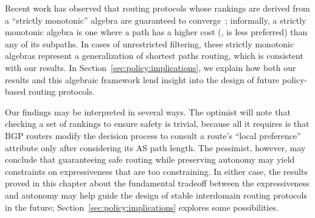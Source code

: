 Recent work has observed that routing protocols whose rankings are
derived from a ``strictly monotonic'' algebra are guaranteed to
converge~\cite{Griffin2005}; informally, a strictly monotonic algebra is
one where a path has a higher cost (\ie, is less preferred) than any
of its
subpaths.  In cases of unrestricted filtering,
these strictly monotonic algebras represent a generalization of shortest
paths routing, which is consistent with our results.  In
Section~\ref{sec:policy:implications}, we explain how both our results
and this algebraic framework lend insight into the design of future
policy-based routing protocols.






Our findings may be interpreted in several ways.  The optimist will note
that checking a set of rankings to ensure safety is trivial, because all
it requires is that BGP routers modify the decision process to consult a
route's ``local preference'' attribute only after considering its AS
path length.  The pessimist, however, may conclude that guaranteeing
safe routing while preserving autonomy may yield constraints on
expressiveness that are too constraining.  In either case, the results
proved in this chapter about the fundamental tradeoff between the
expressiveness and autonomy may help guide the design of stable
interdomain routing protocols in the future;
Section~\ref{sec:policy:implications} explores some possibilities.

